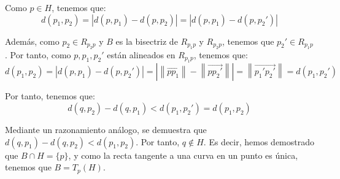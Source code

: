 \begin{ejercicio}
\begin{enumerate}
    Como $p\in H$, tenemos que:
    \begin{equation*}
        d(p_1, p_2) = |d(p, p_1) - d(p, p_2)|
        = |d(p, p_1) - d(p, p_2')|
    \end{equation*}

    Además, como $p_2\in R_{p_2p}$ y $B$ es la bisectriz de $R_{p_1p}$ y $R_{p_2p}$,
    tenemos que $p_2'\in R_{p_1p}$. Por tanto, como $p, p_1, p_2'$ están alineados en $R_{p_1p}$, tenemos que:
    \begin{equation*}
        d(p_1, p_2) = |d(p, p_1) - d(p, p_2')| = \left|
            \left\|\vec{pp_1}\right\| - \left\|\vec{pp_2'}\right\|
        \right|         
        = 
            \left\|\vec{p_1'p_2'}\right\|
        = d(p_1, p_2')
    \end{equation*}

    Por tanto, tenemos que:
    \begin{equation*}
        d(q, p_2)  - d(q, p_1)
        < d(p_1, p_2') = d(p_1, p_2)
    \end{equation*}

    Mediante un razonamiento análogo, se demuestra que $d(q, p_1)  - d(q, p_2) < d(p_1, p_2)$. Por tanto, $q\notin H$.
    Es decir, hemos demostrado que $B\cap H = \{p\}$, y como la recta tangente a una curva en un punto es única,
    tenemos que $B=T_p(H)$.
\end{enumerate}
\end{ejercicio}


